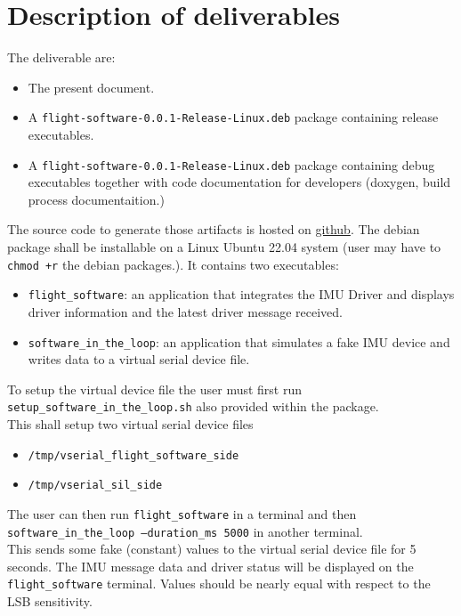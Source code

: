 \section{Description of deliverables}
The deliverable are:
\begin{itemize}
    \item The present document.
    \item A \texttt{flight-software-0.0.1-Release-Linux.deb} package containing release executables.
    \item A \texttt{flight-software-0.0.1-Release-Linux.deb} package containing debug executables together with code documentation for developers (doxygen, build process documentaition.)
\end{itemize}

The source code to generate those artifacts is hosted on \href{https://github.com/renn0xtek9/assignment}{github}.
The debian package shall be installable on a Linux Ubuntu 22.04 system (user may have to \texttt{chmod +r} the debian packages.).
It contains two executables:
\begin{itemize}
    \item \texttt{flight\_software}: an application that integrates the IMU Driver and displays driver information and the latest driver message received.
    \item \texttt{software\_in\_the\_loop}: an application that simulates a fake IMU device and writes data to a virtual serial device file.
\end{itemize}
To setup the virtual device file the user must first run \texttt{setup\_software\_in\_the\_loop.sh} also provided within the package.\\
This shall setup two virtual serial device files
\begin{itemize}
    \item \texttt{/tmp/vserial\_flight\_software\_side}
    \item \texttt{/tmp/vserial\_sil\_side}
\end{itemize}
The user can then run \newline \texttt{flight\_software} \newline in a terminal and then \newline \texttt{software\_in\_the\_loop --duration\_ms 5000} \newline in another terminal. \\
This sends some fake (constant) values to the virtual serial device file for 5 seconds.
The IMU message data and driver status will be displayed on the \texttt{flight\_software} terminal. Values should be nearly equal with respect to the LSB sensitivity.

